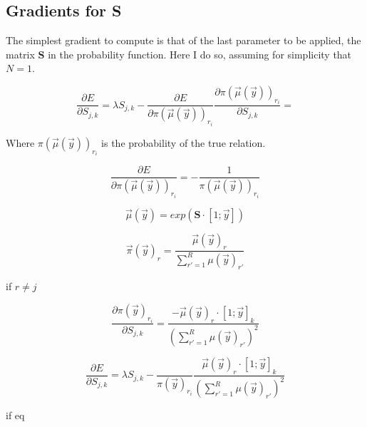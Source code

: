 \documentclass[12pt,leqno,tbtags,twoside]{article}
\theoremstyle{dotless}
\begin{document}
\subsection{Gradients for S}

The simplest gradient to compute is that of the last parameter to be applied, the matrix $\mathbf{S}$ in the probability function. Here I do so, assuming for simplicity that $N = 1$.

\begin{equation}
\frac{\partial E}{\partial S_{j,k}} = \lambda S_{j,k} - \frac{\partial E}{\partial \pi(\vec{\mu}(\vec{y}))_{r_i}}\frac{\partial \pi(\vec{\mu}(\vec{y}))_{r_i}}{\partial S_{j,k}} = 
\end{equation}

Where $\pi(\vec{\mu}(\vec{y}))_{r_i}$ is the probability of the true relation.

\begin{equation}
\frac{\partial E}{\partial \pi(\vec{\mu}(\vec{y}))_{r_i}} = -\frac{ 1 }{\pi(\vec{\mu}(\vec{y}))_{r_i}}
\end{equation}

\begin{equation}
\vec{\mu}(\vec{y}) = exp(\mathbf{S}\cdot[1; \vec{y}])
\end{equation}

\begin{equation}
\vec{\pi}(\vec{y})_r = \frac{\vec{\mu}(\vec{y})_r}{\sum_{r' = 1}^R \mu(\vec{y})_{r'}}
\end{equation}

if $r \neq j$


%

\begin{equation}
\frac{\partial \pi(\vec{y})_{r_i}}{\partial S_{j,k}} = \frac{-\vec{\mu}(\vec{y})_r\cdot [1; \vec{y}]_{k}}{(\sum_{r' = 1}^R \mu(\vec{y})_{r'})^2}
\end{equation}


\begin{equation}
\frac{\partial E}{\partial S_{j,k}} = \lambda S_{j,k} - \frac{ }{\pi(\vec{y})_{r_i}} \frac{\vec{\mu}(\vec{y})_r\cdot [1; \vec{y}]_{k}}{(\sum_{r' = 1}^R \mu(\vec{y})_{r'})^2}
\end{equation}


%

if eq
\end{document}
